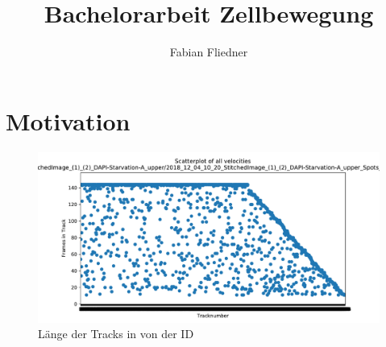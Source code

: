 \documentclass[]{article}
\title{Bachelorarbeit Zellbewegung}
\author{Fabian Fliedner}
\begin{document}
\maketitle

\begin{abstract}

\end{abstract}

\section{Motivation}
\begin{figure}
	\centering
	\includegraphics[width=0.7\linewidth]{BildDateien/length_of_all_tracks}
	\caption[Tracklänge nach ID]{Länge der Tracks in von der ID}
	\label{fig:lengthofalltracks}
\end{figure}
\end{document}
